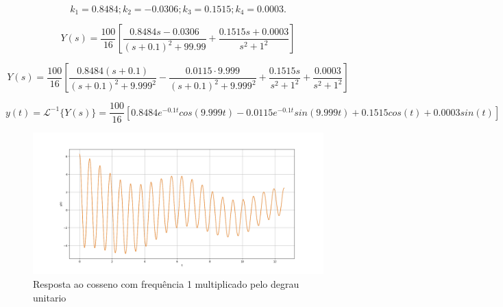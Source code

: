 \documentclass[10pt]{article}
\begin{document}
\begin{equation}
    k_1 = 0.8484; k_2 = -0.0306; k_3 = 0.1515; k_4 = 0.0003.
\end{equation}

\begin{equation}
    Y(s) = \frac{100}{16} \left[ \frac{0.8484s -0.0306}{(s + 0.1)^2 + 99.99} + \frac{0.1515s + 0.0003}{s^2 + 1^2} \right]
\end{equation}

\begin{equation}
    Y(s) = \frac{100}{16} \left[ \frac{0.8484(s + 0.1)}{(s + 0.1)^2 + 9.999^2} - \frac{0.0115 \cdot 9.999}{(s + 0.1)^2 + 9.999^2} + \frac{0.1515s}{s^2 + 1^2} + \frac{0.0003}{s^2 + 1^2} \right]
\end{equation}

\begin{equation}
    y(t) = \mathcal{L}^{-1} \{Y(s) \} = \frac{100}{16} \left[ 0.8484e^{-0.1t}cos(9.999t) - 0.0115e^{-0.1t}sin(9.999t) + 0.1515cos(t) + 0.0003sin(t) \right]
\end{equation}

\begin{figure}[h]
    \centering
    \includegraphics[scale=0.45]{questao1.png}
    \caption{Resposta ao cosseno com frequência 1 multiplicado pelo degrau unitario}
\end{figure}
\end{document}
